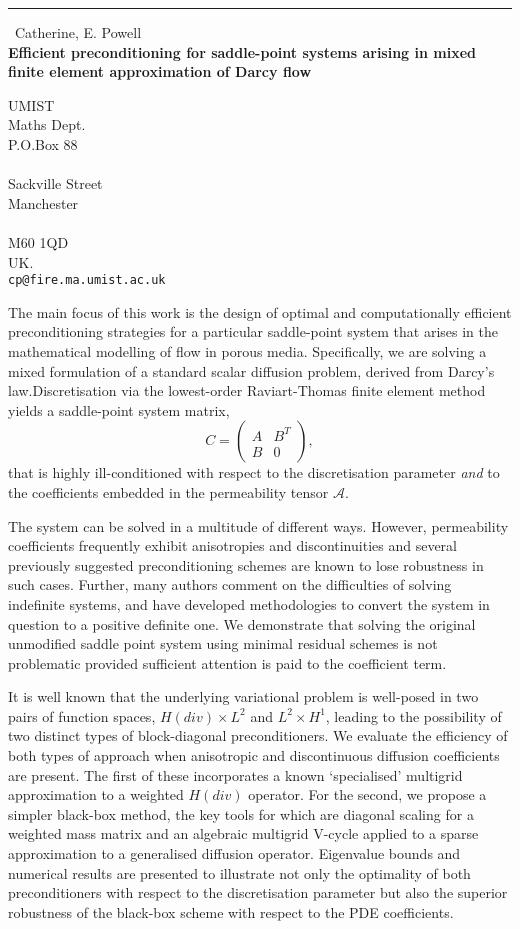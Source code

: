 \documentclass{report}
\begin{document}
\begin{center}
\rule{6in}{1pt} \
{\large Catherine, E. Powell \\
{\bf Efficient preconditioning for saddle-point systems arising in mixed finite element approximation of Darcy flow}}

UMIST \\ Maths Dept. \\ P.O.Box 88 \\ \\ Sackville Street \\ Manchester \\ \\ M60 1QD \\ UK.
\\
{\tt cp@fire.ma.umist.ac.uk}\end{center}

The main focus of this work is the design of optimal and computationally
efficient preconditioning strategies for a particular saddle-point system
that arises in the mathematical modelling of flow in porous media.
Specifically, we are solving a mixed formulation of a standard scalar
diffusion problem, derived from Darcy's law.Discretisation via the
lowest-order Raviart-Thomas finite element method yields a saddle-point
system matrix,
$$ C = \left(\begin{array}{cc} A & B^{T} \\ B & 0
\end{array}\right),$$
\noindent that is highly ill-conditioned with respect to the
discretisation parameter \textit{and} to the coefficients embedded in the
permeability tensor $\mathcal{A}.$

The system can be solved in a multitude of different ways. However,
permeability coefficients frequently exhibit anisotropies and
discontinuities and several previously suggested preconditioning schemes
are known to lose robustness in such cases. Further, many authors comment
on the difficulties of solving indefinite systems, and have developed
methodologies to convert the system in question to a positive definite
one. We demonstrate that solving the original unmodified saddle point
system using minimal residual schemes is not problematic provided
sufficient attention is paid to the coefficient term.

It is well known that the underlying variational problem is well-posed in
two pairs of function spaces, $H(div)\times L^{2}$ and $L^{2} \times
H^{1}$, leading to the possibility of two distinct types of
block-diagonal preconditioners. We evaluate the efficiency of both types
of approach when anisotropic and discontinuous diffusion coefficients are
present. The
first of these incorporates a known `specialised' multigrid approximation
to a weighted $H(div)$ operator. For the
second, we propose a simpler black-box method, the key tools
for which are diagonal scaling for a weighted mass matrix and an
algebraic multigrid V-cycle applied to a sparse approximation to a
generalised diffusion operator. Eigenvalue bounds and numerical results
are presented to illustrate not only the optimality of both
preconditioners with respect to the discretisation parameter but also the
superior robustness of the black-box scheme with respect to the PDE
coefficients.
\end{document}
